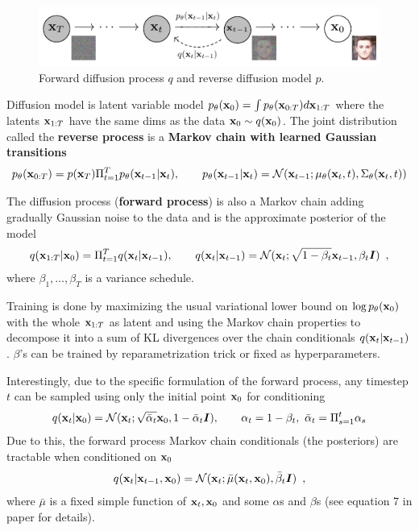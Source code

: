 \begin{figure}[ht]
\centering
\includegraphics[width=12cm]{diffusion_Figure1.png}
\caption{Forward diffusion process $q$ and reverse diffusion model $p$.}
\end{figure}
Diffusion model is latent variable model 
$p_{\theta}({\mathbf{x}}_0) = \int p_{\theta}({\mathbf{x}}_{0:T}) d{\mathbf{x}}_{1:T}$ where the latents ${\mathbf{x}}_{1:T}$ have the same dims as the data ${\mathbf{x}}_0 \sim q({\mathbf{x}}_0)$.
The joint distribution called the \textbf{reverse process} is a \textbf{Markov chain with learned Gaussian transitions}
\begin{align*}
p_{\theta}({\mathbf{x}}_{0:T}) = p({\mathbf{x}}_T) \Pi_{t=1}^T p_{\theta}({\mathbf{x}}_{t-1} \vert {\mathbf{x}}_{t}), \qquad p_{\theta}({\mathbf{x}}_{t-1} \vert {\mathbf{x}}_{t}) = \mathcal{N}({\mathbf{x}}_{t-1}; \mu_{\theta}({\mathbf{x}}_t, t), \Sigma_{\theta}({\mathbf{x}}_t, t))
\end{align*}

The diffusion process (\textbf{forward process}) is also a Markov chain adding gradually Gaussian noise to the data and is the approximate posterior of the model
\begin{align*}
q({\mathbf{x}}_{1:T} \vert {\mathbf{x}}_0) = \Pi_{t=1}^T q({\mathbf{x}}_{t} \vert {\mathbf{x}}_{t-1}), \qquad q({\mathbf{x}}_{t} \vert {\mathbf{x}}_{t-1}) = \mathcal{N}({\mathbf{x}}_{t}; \sqrt{1 - \beta_t}{\mathbf{x}}_{t-1}, \beta_t {\bm{I}}) \enspace , 
\end{align*}
where $\beta_1, \ldots, \beta_T$ is a variance schedule.

Training is done by maximizing the usual variational lower bound on $\log p_{\theta}({\mathbf{x}}_0)$ with the whole ${\mathbf{x}}_{1:T}$ as latent and using the Markov chain properties to decompose it into a sum of KL divergences over the chain conditionals $q({\mathbf{x}}_{t} \vert {\mathbf{x}}_{t-1})$.
$\beta$'s can be trained by reparametrization trick or fixed as hyperparameters.

Interestingly, due to the specific formulation of the forward process, any timestep $t$ can be sampled using only the initial point ${\mathbf{x}}_0$ for conditioning 
\begin{align*}
q({\mathbf{x}}_{t} \vert {\mathbf{x}}_0) = \mathcal{N}({\mathbf{x}}_{t}; \sqrt{\bar\alpha_t}{\mathbf{x}}_{0}, 1-\bar\alpha_t {\bm{I}}), \qquad \alpha_t = 1 - \beta_t, \ \bar\alpha_t = \Pi_{s=1}^t \alpha_s
\end{align*}
Due to this, the forward process Markov chain conditionals (the posteriors) are tractable when conditioned on ${\mathbf{x}}_0$
\begin{align*}
q({\mathbf{x}}_{t} \vert {\mathbf{x}}_{t-1}, {\mathbf{x}}_0) = \mathcal{N}({\mathbf{x}}_{t}; \bar\mu({\mathbf{x}}_t, {\mathbf{x}}_0), \bar\beta_t {\bm{I}}) \enspace ,
\end{align*}
where $\bar\mu$ is a fixed simple function of ${\mathbf{x}}_t, {\mathbf{x}}_0$ and some $\alpha$s and $\beta$s (see equation 7 in paper for details).

